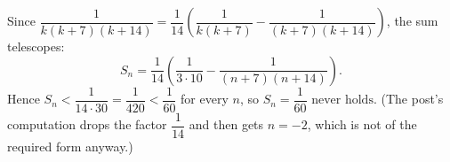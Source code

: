 Since $\dfrac{1}{k(k+7)(k+14)}=\dfrac1{14}\left(\dfrac{1}{k(k+7)}-\dfrac{1}{(k+7)(k+14)}\right)$, the sum telescopes:
\[S_n=\dfrac1{14}\left(\dfrac{1}{3\cdot10}-\dfrac{1}{(n+7)(n+14)}\right).\]
Hence $S_n<\dfrac{1}{14\cdot30}=\dfrac1{420}<\dfrac1{60}$ for every $n$, so $\boxed{S_n=\dfrac1{60}\text{ never holds}}$. (The post's computation drops the factor $\dfrac1{14}$ and then gets $n=-2$, which is not of the required form anyway.)
